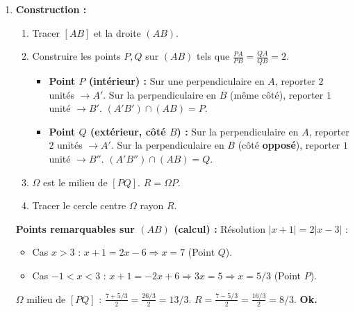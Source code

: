 \documentclass[11pt]{article}
\begin{document}
\begin{exoresolu}[Rapport de distances $\frac{MA}{MB} = k$ — Cercle d'Apollonius]
\begin{enumerate}
    \item \textbf{Construction :}
    \begin{enumerate}
        \item Tracer $[AB]$ et la droite $(AB)$.
        \item Construire les points $P, Q$ sur $(AB)$ tels que $\frac{PA}{PB} = \frac{QA}{QB} = 2$.
        \begin{itemize}
            \item \textbf{Point $P$ (intérieur) :} Sur une perpendiculaire en $A$, reporter $2$ unités $\to A'$. Sur la perpendiculaire en $B$ (même côté), reporter $1$ unité $\to B'$. $(A'B') \cap (AB) = P$.
            \item \textbf{Point $Q$ (extérieur, côté $B$) :} Sur la perpendiculaire en $A$, reporter $2$ unités $\to A'$. Sur la perpendiculaire en $B$ (côté \textbf{opposé}), reporter $1$ unité $\to B''$. $(A'B'') \cap (AB) = Q$.
        \end{itemize}
        \item $\Omega$ est le milieu de $[PQ]$. $R = \Omega P$.
        \item Tracer le cercle centre $\Omega$ rayon $R$.
    \end{enumerate}
    \textbf{Points remarquables sur $(AB)$ (calcul) :}
    Résolution $|x+1| = 2|x-3|$ :
    \begin{itemize}
        \item Cas $x>3$ : $x+1=2x-6 \Rightarrow x=7$ (Point $Q$).
        \item Cas $-1<x<3$ : $x+1=-2x+6 \Rightarrow 3x=5 \Rightarrow x=5/3$ (Point $P$).
    \end{itemize}
    $\Omega$ milieu de $[PQ]$ : $\frac{7 + 5/3}{2} = \frac{26/3}{2} = 13/3$. $R = \frac{7 - 5/3}{2} = \frac{16/3}{2} = 8/3$. \textbf{Ok.}
\end{enumerate}
\end{exoresolu}
\end{document}
